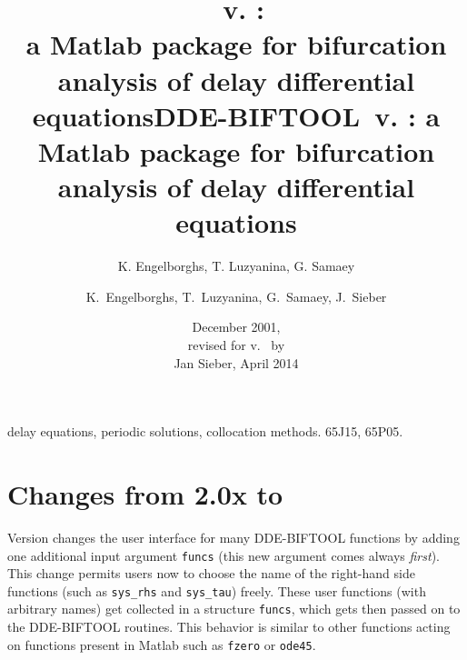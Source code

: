 \documentclass[10pt]{scrartcl}
\title{{\DDEBIFCODE\ v. \version{}}:\\
  a Matlab package  for bifurcation analysis
          of delay differential equations}
\author{K. Engelborghs, T. Luzyanina, G. Samaey}
\date{December 2001, \\[2ex]
revised for v.~\version{} by\\ Jan Sieber,  April 2014}
\newcommand{\DDEBIFCODE}{\textsc{DDE-BIFTOOL}}
\newcommand{\blist}[1]{\mbox{\lstinline!#1!}}
\begin{document}
\begin{coverpage}

\begin{abstract}
\begin{quotation}             

\end{quotation}
\end{abstract}

\keywords delay equations, periodic solutions, collocation methods.   
\AMS \Primary 65J15,            %
     \Secondary 65P05.          %

\end{coverpage}


\title{{\DDEBIFCODE\ v. \version}: a Matlab package for bifurcation 
analysis of delay differential equations}

\author{K.~Engelborghs, T.~Luzyanina, G.~Samaey, J.~Sieber}

%
%
\tableofcontents
\section{Changes from 2.0x to \version}
\label{sec:changes}
Version \version{} changes the user interface for many \DDEBIFCODE{}
functions by adding one additional input argument \blist{funcs} (this
new argument comes always \emph{first}). This change permits users now
to choose the name of the right-hand side functions (such as
\blist{sys_rhs} and \blist{sys_tau}) freely. These user functions
(with arbitrary names) get collected in a structure \blist{funcs},
which gets then passed on to the \DDEBIFCODE{} routines. This behavior
is similar to other functions acting on functions present in Matlab
such as \blist{fzero} or \blist{ode45}.
\end{document}

